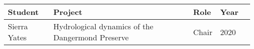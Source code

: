 
\begin{longtable}{lp{6.5cm} p{4.5cm}p{2cm}p{4cm}}
Student & Project & Role & Year \\
\hline 
\endhead 
Sierra Yates & Hydrological dynamics of the Dangermond Preserve & Chair & 2020 \\
\end{longtable}


